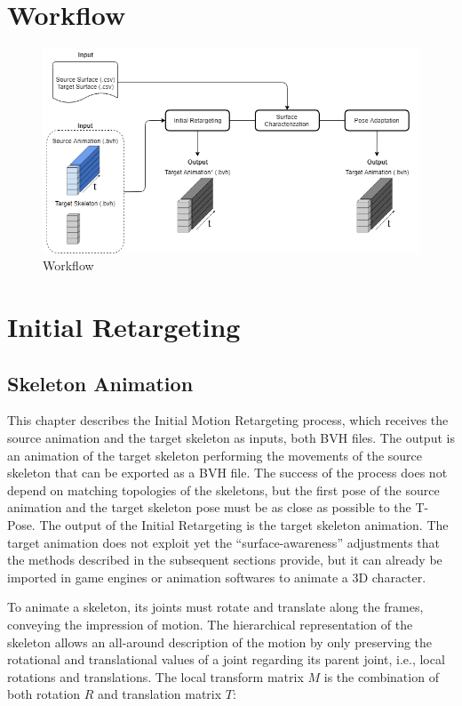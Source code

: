 \documentclass{vgtc}
\makeatletter
\def\maxwidth{\ifdim\Gin@nat@width>\linewidth\linewidth
    \else\Gin@nat@width\fi}
\let\Oldincludegraphics\includegraphics
\renewcommand{\includegraphics}[1]{\Oldincludegraphics[width=.8\maxwidth]{#1}}
\makeatother
\begin{document}
    \section{Workflow}\label{workflow}

\begin{figure}
\centering
\includegraphics{../figures/Workflow3.png}
\caption{Workflow}
\end{figure}

    \section{Initial Retargeting}\label{initial-retargeting}

\subsection{Skeleton Animation}\label{skeleton-animation}

This chapter describes the Initial Motion Retargeting process, which
receives the source animation and the target skeleton as inputs, both
BVH files. The output is an animation of the target skeleton performing
the movements of the source skeleton that can be exported as a BVH file.
The success of the process does not depend on matching topologies of the
skeletons, but the first pose of the source animation and the target
skeleton pose must be as close as possible to the T-Pose. The output of
the Initial Retargeting is the target skeleton animation. The target
animation does not exploit yet the ``surface-awareness'' adjustments
that the methods described in the subsequent sections provide, but it
can already be imported in game engines or animation softwares to
animate a 3D character.

To animate a skeleton, its joints must rotate and translate along the
frames, conveying the impression of motion. The hierarchical
representation of the skeleton allows an all-around description of the
motion by only preserving the rotational and translational values of a
joint regarding its parent joint, i.e., local rotations and
translations. The local transform matrix \(M\) is the combination of
both rotation \(R\) and translation matrix \(T\):
\end{document}
